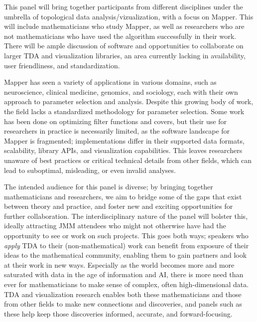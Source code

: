 This panel will bring together participants from different disciplines under the umbrella of topological data analysis/vizualization, with a focus on Mapper. This will include mathematicians who study Mapper, as well as researchers who are not mathematicians who have used the algorithm successfully in their work. There will be ample discussion of software and opportunities to collaborate on larger TDA and visualization libraries, an area currently lacking in availability, user friendliness, and standardization. 

Mapper has seen a variety of applications in various domains, such as neuroscience, clinical medicine, genomics, and sociology, each with their own approach to parameter selection and analysis. Despite this growing body of work, the field lacks a standardized methodology for parameter selection. Some work has been done on optimizing filter functions and covers, but their use for researchers in practice is necessarily limited, 
as the software landscape for Mapper is fragmented; implementations differ in their supported data formats, scalability, library APIs, and visualization capabilities. This leaves researchers unaware of best practices or critical technical details from other fields, which can lead to suboptimal, misleading, or even invalid analyses.

The intended audience for this panel is diverse; by bringing together mathematicians and researchers, we aim to bridge some of the gaps that exist between theory and practice, and foster new and exciting opportunities for further collaboration. The interdisciplinary nature of the panel will bolster this, ideally attracting JMM attendees who might not otherwise have had the opportunity to see or work on such projects. This goes both ways; speakers who \textit{apply} TDA to their (non-mathematical) work can benefit from exposure of their ideas to the mathematical community, enabling them to gain partners and look at their work in new ways. Especially as the world becomes more and more saturated with data in the age of information and AI, there is more need than ever for mathematicians to make sense of complex, often high-dimensional data. TDA and visualization research enables both these mathematicians and those from other fields to make new connections and discoveries, and panels such as these help keep those discoveries informed, accurate, and forward-focusing.